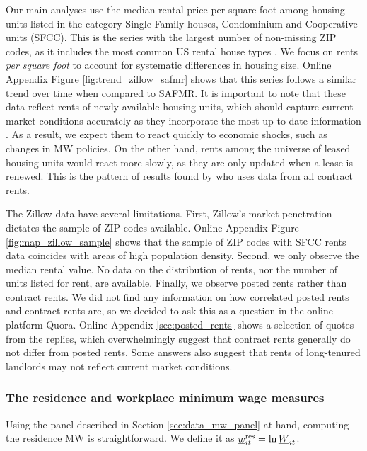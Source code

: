 Our main analyses use the median rental price per square foot among housing 
units listed in the category Single Family houses, Condominium and Cooperative 
units (SFCC).
This is the series with the largest number of non-missing ZIP codes, as it 
includes the most common US rental house types \parencite{Fernald2020}.
We focus on rents \textit{per square foot} to account for systematic 
differences in housing size.
Online Appendix Figure \ref{fig:trend_zillow_safmr} shows that this series 
follows a similar trend over time when compared to SAFMR.
It is important to note that these data reflect rents of newly available 
housing units, which should capture current market conditions accurately as 
they incorporate the most up-to-date information \parencite{AmbroseEtAl2015}.
As a result, we expect them to react quickly to economic shocks, such as 
changes in MW policies.
On the other hand, rents among the universe of leased housing units would 
react more slowly, as they are only updated when a lease is renewed.
This is the pattern of results found by \textcite{AgarwalEtAl2021} who uses
data from all contract rents.

The Zillow data have several limitations.
First, Zillow's market penetration dictates the sample of ZIP codes available.
Online Appendix Figure \ref{fig:map_zillow_sample} shows that the sample of ZIP 
codes with SFCC rents data coincides with areas of high population density.
Second, we only observe the median rental value.
No data on the distribution of rents, nor the number of units listed for rent, 
are available.
Finally, we observe posted rents rather than contract rents.
We did not find any information on how correlated posted rents and contract 
rents are, so we decided to ask this as a question in the online platform Quora.
Online Appendix \ref{sec:posted_rents} shows a selection of quotes from the 
replies, which overwhelmingly suggest that contract rents generally do not 
differ from posted rents.
Some answers also suggest that rents of long-tenured landlords may not
reflect current market conditions.

\subsubsection{The residence and workplace minimum wage measures}
\label{sec:data_mw_measures}

Using the panel described in Section \ref{sec:data_mw_panel} at hand, computing 
the residence MW is straightforward.
We define it as $\underline{w}^{\text{res}}_{it} = \ln \underline{W}_{it}$.

